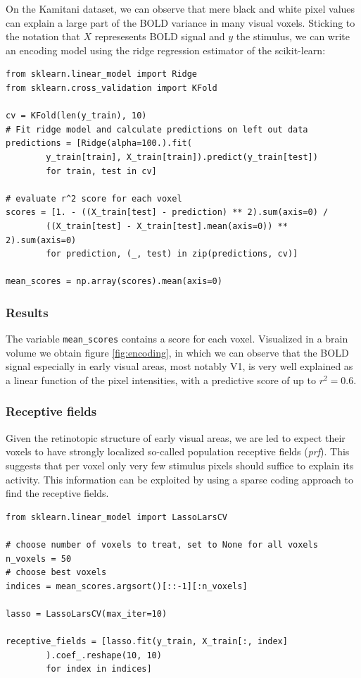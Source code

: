 \documentclass{frontiersSCNS} %
\begin{document}
On the Kamitani dataset, we can observe that mere black and white pixel values can explain a large part of the BOLD variance in many visual voxels. Sticking to the notation that \(X\) represesents BOLD signal and \(y\) the stimulus, we can write an encoding model using the ridge regression estimator of the scikit-learn:

\begin{lstlisting}
from sklearn.linear_model import Ridge
from sklearn.cross_validation import KFold

cv = KFold(len(y_train), 10)
# Fit ridge model and calculate predictions on left out data
predictions = [Ridge(alpha=100.).fit(
        y_train[train], X_train[train]).predict(y_train[test])
        for train, test in cv]

# evaluate r^2 score for each voxel
scores = [1. - ((X_train[test] - prediction) ** 2).sum(axis=0) /
        ((X_train[test] - X_train[test].mean(axis=0)) ** 2).sum(axis=0)
        for prediction, (_, test) in zip(predictions, cv)]

mean_scores = np.array(scores).mean(axis=0)

\end{lstlisting}

\subsubsection{Results}
The variable \texttt{mean\_scores} contains a score for each voxel. Visualized in a brain volume we obtain figure \ref{fig:encoding}, in which we can observe that the BOLD signal especially in early visual areas, most notably V1, is very well explained as a linear function of the pixel intensities, with a predictive score of up to \(r^2 = 0.6\).

\subsubsection{Receptive fields}
Given the retinotopic structure of early visual areas, we are led to expect their voxels to have strongly localized so-called population receptive fields (\textit{prf}). This suggests that per voxel only very few stimulus pixels should suffice to explain its activity. This information can be exploited by using a sparse coding approach to find the receptive fields.

\begin{lstlisting}
from sklearn.linear_model import LassoLarsCV

# choose number of voxels to treat, set to None for all voxels
n_voxels = 50
# choose best voxels
indices = mean_scores.argsort()[::-1][:n_voxels]

lasso = LassoLarsCV(max_iter=10)

receptive_fields = [lasso.fit(y_train, X_train[:, index]
        ).coef_.reshape(10, 10)
        for index in indices]

\end{lstlisting}
\end{document}
